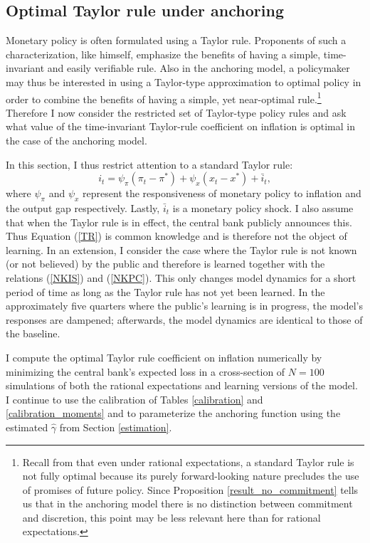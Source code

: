 \documentclass[11pt]{article}
\renewcommand{\[}{\begin{equation}}
\renewcommand{\]}{\end{equation}}
\begin{document}
  
\subsection{Optimal Taylor rule under anchoring}\label{opt_TR}
Monetary policy is often formulated using a Taylor rule. Proponents of such a characterization, like \cite{taylor1993discretion} himself, emphasize the benefits of having a simple, time-invariant and easily verifiable rule. Also in the anchoring model, a policymaker may thus be interested in using a Taylor-type approximation to optimal policy in order to combine the benefits of having a simple, yet near-optimal rule.\footnote{Recall from \cite{woodford2011interest} that even under rational expectations, a standard Taylor rule is not fully optimal because its purely forward-looking nature precludes the use of promises of future policy. Since Proposition \ref{result_no_commitment} tells us that in the anchoring model there is no distinction between commitment and discretion, this point may be less relevant here than for rational expectations.} Therefore I now consider the restricted set of Taylor-type policy rules and ask what value of the time-invariant Taylor-rule coefficient on inflation is optimal in the case of the anchoring model.

In this section, I thus restrict attention to a standard Taylor rule:
\begin{equation}
i_t = \psi_{\pi}(\pi_t -\pi^*) + \psi_{x} (x_t -x^*) + \bar{i}_t  \label{TR},
\end{equation}
where $\psi_{\pi}$ and $\psi_{x}$ represent the responsiveness of monetary policy to inflation and the output gap respectively. Lastly, $\bar{i}_t$ is a monetary policy shock. I also assume that when the Taylor rule is in effect, the central bank publicly announces this. Thus Equation (\ref{TR}) is common knowledge and is therefore not the object of learning. In an extension, I consider the case where the Taylor rule is not known (or not believed) by the public and therefore is learned together with the relations (\ref{NKIS}) and (\ref{NKPC}). This only changes model dynamics for a short period of time as long as the Taylor rule has not yet been learned. In the approximately five quarters where the public's learning is in progress, the model's responses are dampened; afterwards, the model dynamics are identical to those of the baseline. 

I compute the optimal Taylor rule coefficient on inflation numerically by minimizing the central bank's expected loss in a cross-section of $N=100$ simulations of both the rational expectations and learning versions of the model. I continue to use the calibration of Tables \ref{calibration} and \ref{calibration_moments} and to parameterize the anchoring function using the estimated $\hat{\gamma}$ from Section \ref{estimation}.
\end{document}
